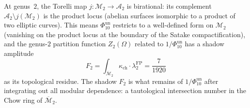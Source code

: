 \begin{remark}
\label{rem:torelli-bridge}
At genus~$2$, the Torelli map
$j\colon \mathcal{M}_2 \to \mathcal{A}_2$ is birational:
its complement $\mathcal{A}_2 \setminus j(\mathcal{M}_2)$
is the product locus (abelian surfaces isomorphic to a
product of two elliptic curves). This means \(\Phi_{10}^{\mathrm{un}}\)
restricts to a well-defined form on $\mathcal{M}_2$
(vanishing on the product locus at the boundary of the
Satake compactification), and the genus-$2$ partition
function \(Z_2(\Omega)\) related to \(1/\Phi_{10}^{\mathrm{un}}\) has a
shadow amplitude
\[
F_2 = \int_{\overline{\mathcal{M}}_2} \kappa_{\mathrm{ch}} \cdot
\lambda_2^{\mathrm{FP}} = \frac{7}{1920}
\]
as its topological residue. The shadow $F_2$ is what
remains of \(1/\Phi_{10}^{\mathrm{un}}\) after integrating out all modular
dependence: a tautological intersection number in the
Chow ring of $\overline{\mathcal{M}}_2$.
\end{remark}

